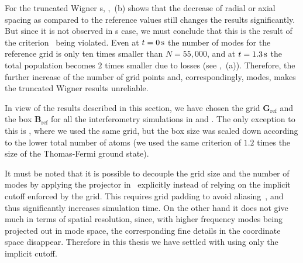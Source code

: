 For the truncated Wigner s, ,~(b) shows that the decrease of radial or axial spacing as compared to the reference values still changes the results significantly.
But since it is not observed in s case, we must conclude that this is the result of the criterion~ being violated.
Even at $t=0\mbox{\ensuremath{\,\mathrm{s}}}$ the number of modes for the reference grid is only ten times smaller than $N=55,000$, and at $t=1.3\mbox{\ensuremath{\,\mathrm{s}}}$ the total population becomes $2$ times smaller due to losses (see ,~(a)).
Therefore, the further increase of the number of grid points and, correspondingly, modes, makes the truncated Wigner results unreliable.

In view of the results described in this section, we have chosen the grid $\mathbf{G}_{\mathrm{ref}}$ and the box $\mathbf{B}_{\mathrm{ref}}$ for all the interferometry simulations in  and .
The only exception to this is , where we used the same grid, but the box size was scaled down according to the lower total number of atoms (we used the same criterion of $1.2$ times the size of the Thomas-Fermi ground state).

It must be noted that it is possible to decouple the grid size and the number of modes by applying the projector in~ explicitly instead of relying on the implicit cutoff enforced by the grid.
This requires grid padding to avoid aliasing~\cite{Norrie2006}, and thus significantly increases simulation time.
On the other hand it does not give much in terms of spatial resolution, since, with higher frequency modes being projected out in mode space, the corresponding fine details in the coordinate space disappear.
Therefore in this thesis we have settled with using only the implicit cutoff.

